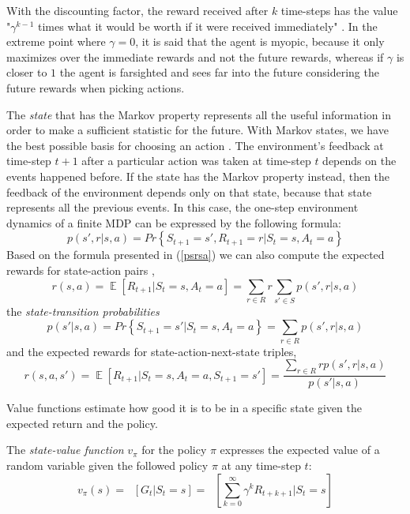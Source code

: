 With the discounting factor, the reward received after $k$ time-steps has the value "$\gamma ^{k-1}$ times what it would be worth if it were received immediately" \cite{Sutton}. In the extreme point where $\gamma=0$, it is said that the agent is myopic, because it only maximizes over the immediate rewards and not the future rewards, whereas if $\gamma$ is closer to $1$ the agent is farsighted and sees far into the future considering the future rewards when picking actions.

The \textit{state} that has the Markov property represents all the useful information in order to make a sufficient statistic for the future. With Markov states, we have the best possible basis for choosing an action \cite{Sutton}. The environment's feedback at time-step $t+1$ after a particular action was taken at time-step $t$ depends on the events happened before. If the state has the Markov property instead, then the feedback of the environment depends only on that state, because that state represents all the previous events. In this case, the one-step environment dynamics of a finite MDP can be expressed by the following formula:
\begin{equation}\label{psrsa}
p(s',r|s,a)=Pr\left \{ S_{t+1}=s',R_{t+1}=r|S_{t}=s,A_{t}=a \right \}
\end{equation}
Based on the formula presented in (\ref{psrsa}) we can also compute the expected rewards for state-action pairs \cite{Sutton},
\begin{equation}
r(s,a)=\mathop{{}\mathbb{E}}\left [ R_{t+1}|S_{t}=s,A_{t}=a \right ]=\sum_{r\in R}r\sum_{s'\in S}p(s',r|s,a)
\end{equation}
the \textit{state-transition probabilities}
\begin{equation}
p(s'|s,a)=Pr\left \{ S_{t+1}=s'|S_{t}=s,A_{t}=a \right \}=\sum_{r\in R}p(s',r|s,a)
\end{equation}
and the expected rewards for state-action-next-state triples,
\begin{equation}
r(s,a,s')=\mathop{{}\mathbb{E}}\left [ R_{t+1}|S_{t}=s,A_{t}=a,S_{t+1}=s' \right ]=
\frac{\sum_{r\in R}rp(s',r|s,a)}{p(s'|s,a)}
\end{equation}

Value functions estimate how good it is to be in a specific state given the expected return and the policy.

The \textit{state-value function} $v_{\pi }$ for the policy $\pi$ expresses the expected value of a random variable given the followed policy $\pi$ at any time-step $t$:
\begin{equation}
v_{\pi }(s)=\mathop{{}\mathbb{E}_{\pi}}\left [G_{t}|S_{t}=s \right ]=\mathop{{}\mathbb{E}_{\pi}}\left [ \sum_{k=0}^{\infty}\gamma ^kR_{t+k+1} |S_{t}=s\right ]
\end{equation}

